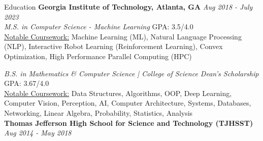 \documentclass{template} %
\begin{document}

\begin{rSection}{Education}
{\bf Georgia Institute of Technology, Atlanta, GA} \hfill {\em Aug 2018 - July 2023}
\\ {\em M.S. in Computer Science - Machine Learning} \hfill  GPA: 3.5/4.0
\vspace{0.1cm}
\\ \underline{Notable Coursework:} Machine Learning (ML), Natural Language Processing (NLP), Interactive Robot Learning (Reinforcement Learning), Convex Optimization, High Performance Parallel Computing (HPC)

{\em B.S. in Mathematics \& Computer Science | College of Science Dean's Scholarship} \hfill  GPA: 3.67/4.0
\vspace{0.1cm}
\\ \underline{Notable Coursework:} Data Structures, Algorithms, OOP, Deep Learning, Computer Vision, Perception, AI, Computer Architecture, Systems, Databases, Networking, Linear Algebra, Probability, Statistics, Analysis
\vspace{0.20cm}
\\ {\bf Thomas Jefferson High School for Science and Technology (TJHSST)} \hfill {\em Aug 2014 - May 2018}
\end{rSection}

\end{document}
